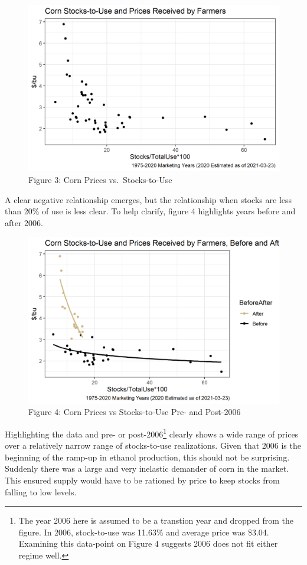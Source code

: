 \documentclass[
]{book}
\begin{document}
\begin{figure}
\centering
\includegraphics{assets/EndingStocksand-StocksUsePrices2.png}
\caption{Figure 3: Corn Prices vs.~Stocks-to-Use}
\end{figure}

A clear negative relationship emerges, but the relationship when stocks are less than 20\% of use is less clear. To help clarify, figure 4 highlights years before and after 2006.

\begin{figure}
\centering
\includegraphics{assets/EndingStocksand-StocksUsePrices3.png}
\caption{Figure 4: Corn Prices vs Stocks-to-Use Pre- and Post-2006}
\end{figure}

Highlighting the data and pre- or post-2006\footnote{The year 2006 here is assumed to be a transtion year and dropped from the figure. In 2006, stock-to-use was 11.63\% and average price was \$3.04. Examining this data-point on Figure 4 suggests 2006 does not fit either regime well.} clearly shows a wide range of prices over a relatively narrow range of stocks-to-use realizations. Given that 2006 is the beginning of the ramp-up in ethanol production, this should not be surprising. Suddenly there was a large and very inelastic demander of corn in the market. This ensured supply would have to be rationed by price to keep stocks from falling to low levels.
\end{document}
